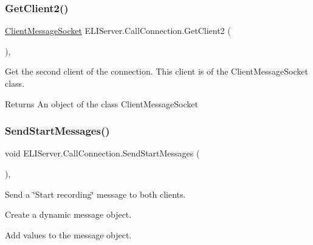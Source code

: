 \subsubsection{\texorpdfstring{Get\+Client2()}{GetClient2()}}
{\footnotesize\ttfamily \hyperlink{class_e_l_i_server_1_1_messaging_1_1_client_message_socket}{Client\+Message\+Socket} E\+L\+I\+Server.\+Call\+Connection.\+Get\+Client2 (\begin{DoxyParamCaption}{ }\end{DoxyParamCaption})\hspace{0.3cm}{\ttfamily [inline]}, {\ttfamily [package]}}



Get the second client of the connection. This client is of the Client\+Message\+Socket class. 

\begin{DoxyReturn}{Returns}
An object of the class Client\+Message\+Socket
\end{DoxyReturn}
\mbox{\label{class_e_l_i_server_1_1_call_connection_ad458164bca02a4640893be5cda913149}} 
\subsubsection{\texorpdfstring{Send\+Start\+Messages()}{SendStartMessages()}}
{\footnotesize\ttfamily void E\+L\+I\+Server.\+Call\+Connection.\+Send\+Start\+Messages (\begin{DoxyParamCaption}{ }\end{DoxyParamCaption})\hspace{0.3cm}{\ttfamily [inline]}, {\ttfamily [private]}}



Send a \char`\"{}\+Start recording\char`\"{} message to both clients. 

Create a dynamic message object.

Add values to the message object. \mbox{\label{class_e_l_i_server_1_1_call_connection_ac9a3d9918d1739e322cc9a4a6fdcbeeb}} 
